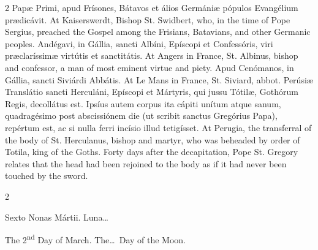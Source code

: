 \begin{paracol}{2}
 Papæ Primi, apud Frísones, Bátavos et álios 
 Germániæ pópulos Evangélium prædicávit.
\switchcolumn
{}
At Kaiserswerdt, Bishop St. Swidbert, who, in the time of Pope Sergius, 
 preached the Gospel among the Frisians, Batavians, and other Germanic 
 peoples.
\switchcolumn*
{}
Andégavi, in Gállia, sancti Albíni, Epíscopi et 
 Confessóris, viri præclaríssimæ virtútis et sanctitátis.
\switchcolumn
{}
At Angers in France, St. Albinus, bishop and confessor, a man of most 
 eminent virtue and piety.
\switchcolumn*
{}
Apud Cenómanos, in Gállia, sancti Siviárdi 
 Abbátis.
\switchcolumn
{}
At Le Mans in France, St. Siviard, abbot.
\switchcolumn*
{}
Perúsiæ Translátio sancti Herculáni, Epíscopi 
 et Mártyris, qui jussu Tótilæ, Gothórum Regis, decollátus est. Ipsíus 
 autem corpus ita cápiti unítum atque sanum, quadragésimo post abscissiónem 
 die (ut scribit sanctus Gregórius Papa), repértum est, ac si nulla ferri 
 incísio illud tetigísset.
\switchcolumn
{}
At Perugia, the transferral of the body of St. Herculanus, bishop and 
 martyr, who was beheaded by order of Totila, king of the Goths. Forty 
 days after the decapitation, Pope St. Gregory relates that the head had been 
 rejoined to the body as if it had never been touched by the sword.
\switchcolumn*
{}
\end{paracol}


\begin{paracol}{2}
\begin{center}{\color{gregoriocolor} Sexto Nonas Mártii. 
 Luna\dots\ }\end{center}
\switchcolumn
{}
\begin{center}{\color{gregoriocolor} The 2\textsuperscript{nd} Day of March. 
 The\dots\ Day of the Moon.}\end{center}
\end{paracol}

